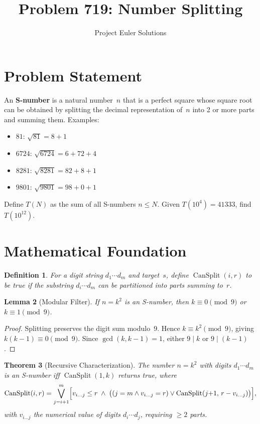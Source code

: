 \documentclass[11pt]{article}
\title{Problem 719: Number Splitting}
\author{Project Euler Solutions}
\date{}
\newtheorem{theorem}{Theorem}
\newtheorem{lemma}[theorem]{Lemma}
\newtheorem{definition}[theorem]{Definition}
\begin{document}
\maketitle

\section{Problem Statement}

An \textbf{S-number} is a natural number~$n$ that is a perfect square whose square root can be obtained by splitting the decimal representation of~$n$ into 2 or more parts and summing them. Examples:
\begin{itemize}
    \item $81$: $\sqrt{81} = 8+1$
    \item $6724$: $\sqrt{6724} = 6+72+4$
    \item $8281$: $\sqrt{8281} = 82+8+1$
    \item $9801$: $\sqrt{9801} = 98+0+1$
\end{itemize}
Define $T(N)$ as the sum of all S-numbers $n \le N$. Given $T(10^4)=41333$, find $T(10^{12})$.

\section{Mathematical Foundation}

\begin{definition}
For a digit string $d_1\cdots d_m$ and target~$s$, define $\operatorname{CanSplit}(i,r)$ to be true if the substring $d_i\cdots d_m$ can be partitioned into parts summing to~$r$.
\end{definition}

\begin{lemma}[Modular Filter]
If $n = k^2$ is an S-number, then $k \equiv 0 \pmod{9}$ or $k \equiv 1 \pmod{9}$.
\end{lemma}

\begin{proof}
Splitting preserves the digit sum modulo~9. Hence $k \equiv k^2 \pmod{9}$, giving $k(k-1) \equiv 0 \pmod{9}$. Since $\gcd(k,k-1)=1$, either $9\mid k$ or $9\mid(k-1)$.
\end{proof}

\begin{theorem}[Recursive Characterization]
The number $n=k^2$ with digits $d_1\cdots d_m$ is an S-number iff $\operatorname{CanSplit}(1,k)$ returns true, where
\[
\operatorname{CanSplit}(i,r) = \bigvee_{j=i+1}^{m} \Bigl[v_{i\ldots j} \le r \;\wedge\; \bigl((j=m \wedge v_{i\ldots j}=r) \vee \operatorname{CanSplit}(j{+}1,\, r-v_{i\ldots j})\bigr)\Bigr],
\]
with $v_{i\ldots j}$ the numerical value of digits $d_i\cdots d_j$, requiring $\ge 2$ parts.
\end{theorem}
\end{document}
